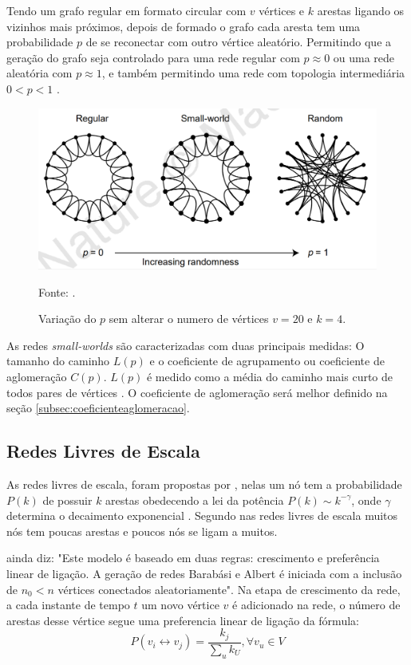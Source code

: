  Tendo um grafo regular em formato circular com $v$ vértices e $k$ arestas ligando os vizinhos mais próximos, depois de formado o grafo cada aresta tem uma probabilidade $p$ de se reconectar com outro vértice aleatório. Permitindo que a geração do grafo seja controlado para uma rede regular com $p \approx 0$ ou uma rede aleatória com $p \approx 1$, e também permitindo uma rede com topologia intermediária $0 < p < 1$ \cite{lopes2011redes}.
 \begin{figure}[!htb]
 	\caption{Variação do $p$ sem alterar o numero de vértices $v = 20$ e $k = 4$.}
 	\begin{center}
 		\includegraphics[width=0.7\linewidth]{imagens/watts-sm}
 	\end{center}
 	\small{Fonte: \citet{watts1998collective}.}
 	\label{fig:watts-sm}
 \end{figure} 
 
 As redes \textit{small-worlds} são caracterizadas com duas principais medidas: O tamanho do caminho $L(p)$ e o coeficiente de agrupamento ou coeficiente de aglomeração $C(p)$. $L(p)$ é medido como a média do caminho mais curto de todos pares de vértices \cite{lopes2011redes}. O coeficiente de aglomeração será melhor definido na seção \ref{subsec:coeficienteaglomeracao}.
 
 \subsection{Redes Livres de Escala}
 As redes livres de escala, foram propostas por \citet{barabasi1999emergence}, nelas um nó tem a probabilidade \(P(k)\) de possuir \(k\) arestas obedecendo a lei da potência \(P(k) \sim k^{-\gamma}\), onde $\gamma$ determina o decaimento exponencial  \cite{Albert2002,Antiqueira2005, lopes2011redes}. Segundo \citet{Viana2007} nas redes livres de escala muitos nós tem poucas arestas e poucos nós se ligam a muitos.
 
\citet{lopes2011redes} ainda diz: "Este modelo é baseado em duas regras: crescimento e preferência linear de ligação. A geração de redes Barabási e Albert é iniciada com a inclusão de $n_0 < n$ vértices conectados aleatoriamente". Na etapa de crescimento da rede, a cada instante de tempo $t$ um novo vértice $v$ é adicionado na rede, o número de arestas desse vértice segue uma preferencia linear de ligação da fórmula:
\[ P(v_i \leftrightarrow v_j) = \frac{k_j}{\sum_u k_U}, \forall v_u \in V \]

